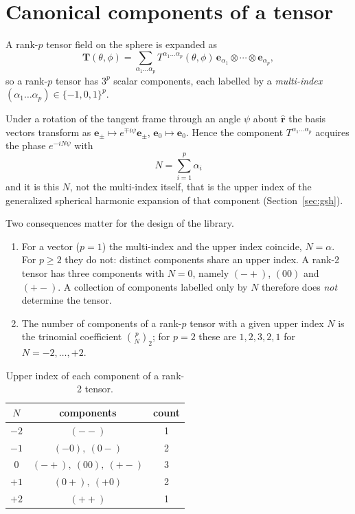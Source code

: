 \documentclass[11pt,a4paper]{article}
\newcommand{\ebasis}[1]{\mathbf{e}_{#1}}
\begin{document}
\section{Canonical components of a tensor}
\label{sec:components}

A rank-$p$ tensor field on the sphere is expanded as
\begin{equation}
  \mathbf{T}(\theta,\phi) = \sum_{\alpha_1 \ldots \alpha_p}
    T^{\alpha_1 \ldots \alpha_p}(\theta,\phi)\,
    \ebasis{\alpha_1} \otimes \cdots \otimes \ebasis{\alpha_p} ,
\end{equation}
so a rank-$p$ tensor has $3^p$ scalar components, each labelled by a
\emph{multi-index} $(\alpha_1 \ldots \alpha_p) \in \{-1,0,1\}^p$.

Under a rotation of the tangent frame through an angle $\psi$ about
$\hat{\mathbf{r}}$ the basis vectors transform as $\ebasis{\pm} \mapsto
e^{\mp i\psi} \ebasis{\pm}$, $\ebasis{0} \mapsto \ebasis{0}$.  Hence the
component $T^{\alpha_1 \ldots \alpha_p}$ acquires the phase
$e^{-iN\psi}$ with
\begin{equation}
  \boxed{\;N = \sum_{i=1}^{p} \alpha_i \;}
  \label{eq:N}
\end{equation}
and it is this $N$, not the multi-index itself, that is the upper index
of the generalized spherical harmonic expansion of that component
(Section~\ref{sec:gsh}).

Two consequences matter for the design of the library.

\begin{enumerate}
  \item For a vector ($p=1$) the multi-index and the upper index
    coincide, $N = \alpha$.  For $p \geq 2$ they do not: distinct
    components share an upper index.  A rank-2 tensor has three
    components with $N=0$, namely $(-+)$, $(00)$ and $(+-)$.  A
    collection of components labelled only by $N$ therefore does
    \emph{not} determine the tensor.
  \item The number of components of a rank-$p$ tensor with a given upper
    index $N$ is the trinomial coefficient
    $\binom{p}{N}_{\!2}$; for $p=2$ these are $1,2,3,2,1$ for
    $N=-2,\ldots,+2$.
\end{enumerate}

\begin{table}[h]
  \centering
  \begin{tabular}{ccc}
    \toprule
    $N$ & components & count \\
    \midrule
    $-2$ & $(--)$ & 1 \\
    $-1$ & $(-0),\ (0-)$ & 2 \\
    $ 0$ & $(-+),\ (00),\ (+-)$ & 3 \\
    $+1$ & $(0+),\ (+0)$ & 2 \\
    $+2$ & $(++)$ & 1 \\
    \bottomrule
  \end{tabular}
  \caption{Upper index of each component of a rank-2 tensor.}
  \label{tab:rank2}
\end{table}
\end{document}
